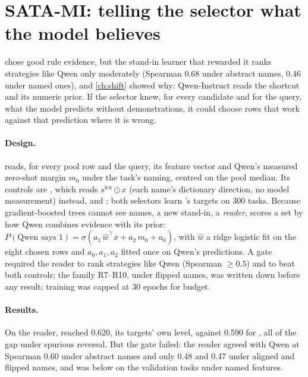 
\section{SATA-MI: telling the selector what the model believes}
\label{sec:satami}

\sata chose good rule evidence, but the stand-in learner that rewarded it ranks strategies like Qwen only moderately (Spearman 0.68 under abstract names, 0.46 under named ones), and \autoref{ch:shift} showed why: Qwen-Instruct reads the shortcut and its numeric prior.
If the selector knew, for every candidate and for the query, what the model predicts without demonstrations, it could choose rows that work against that prediction where it is wrong.

\paragraph{Design.}
\satami reads, for every pool row and the query, its feature vector and Qwen's measured zero-shot margin $m_0$ under the task's naming, centred on the pool median.
Its controls are , which reads $s^{\mathrm{lex}} \odot x$ (each name's dictionary direction, no model measurement) instead, and ; both selectors learn \sata's targets on 300 tasks.
Because gradient-boosted trees cannot see names, a new stand-in, a \emph{reader}, scores a set by how Qwen combines evidence with its prior: $P(\text{Qwen says }1) = \sigma(a_1\, \hat w^\top x + a_2\, m_0 + a_0)$, with $\hat w$ a ridge logistic fit on the eight chosen rows and $a_0, a_1, a_2$ fitted once on Qwen's predictions.
A gate required the reader to rank strategies like Qwen (Spearman $\ge 0.5$) and \satami to beat both controls; the family R7--R10, under flipped names, was written down before any result; training was capped at 30 epochs for budget.

\paragraph{Results.}
On the reader, \satami reached 0.620, its targets' own level, against 0.590 for , all of the gap under spurious reversal.
But the gate failed: the reader agreed with Qwen at Spearman 0.60 under abstract names and only 0.48 and 0.47 under aligned and flipped names, and \satami was below  on the validation tasks under named features.

